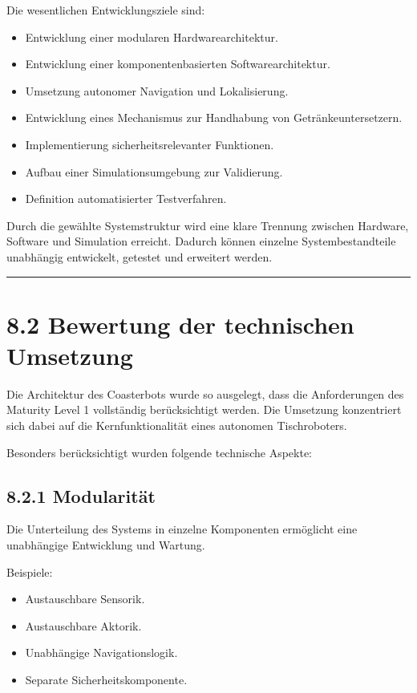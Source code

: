 \documentclass[
  a4paper,
  12pt,
  DIV=12,        %
  parskip=half,  %
  headings=small %
]{scrartcl}
\theoremstyle{definition}
\providecommand{\tightlist}{%
  \setlength{\itemsep}{0pt}\setlength{\parskip}{0pt}}
\theoremstyle{definition}
\providecommand{\tightlist}{%
  \setlength{\itemsep}{0pt}\setlength{\parskip}{0pt}}
\begin{document}
Die wesentlichen Entwicklungsziele sind:

\begin{itemize}
\tightlist
\item
  Entwicklung einer modularen Hardwarearchitektur.
\item
  Entwicklung einer komponentenbasierten Softwarearchitektur.
\item
  Umsetzung autonomer Navigation und Lokalisierung.
\item
  Entwicklung eines Mechanismus zur Handhabung von Getränkeuntersetzern.
\item
  Implementierung sicherheitsrelevanter Funktionen.
\item
  Aufbau einer Simulationsumgebung zur Validierung.
\item
  Definition automatisierter Testverfahren.
\end{itemize}

Durch die gewählte Systemstruktur wird eine klare Trennung zwischen
Hardware, Software und Simulation erreicht. Dadurch können einzelne
Systembestandteile unabhängig entwickelt, getestet und erweitert werden.

\begin{center}\rule{0.5\linewidth}{0.5pt}\end{center}

\section{8.2 Bewertung der technischen
Umsetzung}\label{bewertung-der-technischen-umsetzung}

Die Architektur des Coasterbots wurde so ausgelegt, dass die
Anforderungen des Maturity Level 1 vollständig berücksichtigt werden.
Die Umsetzung konzentriert sich dabei auf die Kernfunktionalität eines
autonomen Tischroboters.

Besonders berücksichtigt wurden folgende technische Aspekte:

\subsection{8.2.1 Modularität}\label{modularituxe4t}

Die Unterteilung des Systems in einzelne Komponenten ermöglicht eine
unabhängige Entwicklung und Wartung.

Beispiele:

\begin{itemize}
\tightlist
\item
  Austauschbare Sensorik.
\item
  Austauschbare Aktorik.
\item
  Unabhängige Navigationslogik.
\item
  Separate Sicherheitskomponente.
\end{itemize}
\end{document}
